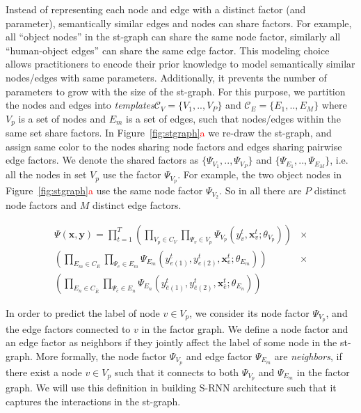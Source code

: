 \documentclass[10pt,twocolumn,letterpaper]{article}
\newcommand{\ve}[1]{\mathbf{#1}}
\newcommand{\mcal}[1]{\mathcal{#1}}
\newcommand{\rc}[1]{\textcolor{red}{#1}}
\begin{document}
Instead of representing each node and edge  with a distinct factor (and parameter), semantically similar edges and nodes can share factors. For example, all ``object nodes'' in the st-graph can share the same node factor, similarly all ``human-object edges'' can share the same edge factor. This modeling choice allows practitioners to encode their prior knowledge to model semantically similar nodes/edges with same parameters. Additionally, it prevents the number of parameters to grow with the size of the st-graph. For this purpose, we partition the nodes and edges into \textit{templates}$\mcal{C}_V=\{V_1,..,V_P\}$ and $\mcal{C}_E=\{E_1,..,E_M\}$ where $V_p$ is a set of nodes and $E_m$ is a set of edges, such that nodes/edges within the same set share factors. In Figure~\ref{fig:stgraph}\rc{a} we re-draw the st-graph, and assign same color to the nodes sharing node factors and edges sharing pairwise edge factors. We denote the shared factors as $\{\Psi_{V_1},..,\Psi_{V_P}\}$ and $\{\Psi_{E_1},..,\Psi_{E_M}\}$, i.e. all the nodes in set $V_p$ use the factor $\Psi_{V_p}$.  For example, the two object nodes in Figure~\ref{fig:stgraph}\rc{a} use the same node factor $\Psi_{V_2}$.  So in all there are $P$ distinct node factors and $M$ distinct edge factors.  

\begin{align}
	\nonumber \Psi(\ve{x},\ve{y})  = \prod_{t=1}^T  \left (\prod_{V_p \in C_V}\prod_{\Psi_v \in V_p} \Psi_{V_p}(y_v^t,\ve{x}_v^t;\theta_{V_p})\right) &\times \\
	\nonumber \left (\prod_{E_m \in C_E }\prod_{\Psi_e \in E_m} \Psi_{E_m}(y_{e(1)}^t,y_{e(2)}^t,\ve{x}_e^t;\theta_{E_m})\right)&\times\\
	\left (\prod_{E_n \in C_{\bar{E}} }\prod_{\Psi_{\bar{e}} \in E_n} \Psi_{E_n}(y_{\bar{e}(1)}^t,y_{\bar{e}(2)}^t,\ve{x}_{\bar{e}}^t;\theta_{E_n})\right)&
\end{align}\fi

In order to predict the label of node $v \in V_p$, we consider its node factor $\Psi_{V_p}$, and the edge factors connected to $v$ in the factor graph. We define a node factor and an edge factor as neighbors if they jointly affect the label of some node in the st-graph. More formally, the node factor $\Psi_{V_p}$ and edge factor $\Psi_{E_m}$ are \textit{neighbors}, if there exist a node $v \in {V_p}$ such that it connects to both $\Psi_{V_p}$ and $\Psi_{E_m}$ in the factor graph. We will use this definition in building S-RNN architecture such that it captures the interactions in the st-graph.
\end{document}

